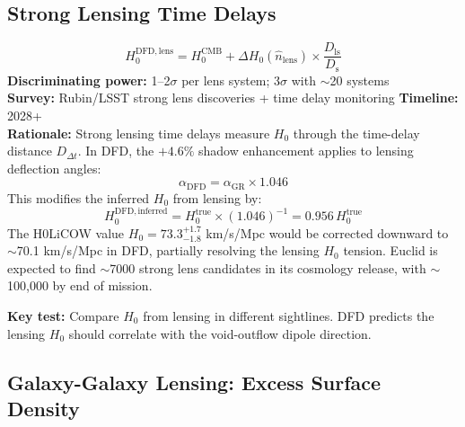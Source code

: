 \documentclass[12pt]{article}
\begin{document}
\subsection{Strong Lensing Time Delays}

\begin{predbox}
\begin{equation}
\boxed{
H_0^\mathrm{DFD,lens} = H_0^\mathrm{CMB} + \Delta H_0(\hat{n}_\mathrm{lens}) \times \frac{D_\mathrm{ls}}{D_\mathrm{s}}
}
\end{equation}
\textbf{Discriminating power:} 1--2$\sigma$ per lens system; 3$\sigma$ with $\sim$20 systems\\
\textbf{Survey:} Rubin/LSST strong lens discoveries + time delay monitoring \quad\textbf{Timeline:} 2028+\\
\textbf{Rationale:} Strong lensing time delays measure $H_0$ through the time-delay distance $D_{\Delta t}$. In DFD, the $+4.6\%$ shadow enhancement applies to lensing deflection angles:
\begin{equation}
\alpha_\mathrm{DFD} = \alpha_\mathrm{GR} \times 1.046
\end{equation}
This modifies the inferred $H_0$ from lensing by:
\begin{equation}
H_0^\mathrm{DFD,inferred} = H_0^\mathrm{true} \times (1.046)^{-1} = 0.956\,H_0^\mathrm{true}
\end{equation}
The H0LiCOW value $H_0 = 73.3^{+1.7}_{-1.8}$ km/s/Mpc would be corrected downward to $\sim$70.1 km/s/Mpc in DFD, partially resolving the lensing $H_0$ tension. Euclid is expected to find $\sim$7000 strong lens candidates in its cosmology release, with $\sim$100,000 by end of mission.

\medskip\noindent
\textbf{Key test:} Compare $H_0$ from lensing in different sightlines. DFD predicts the lensing $H_0$ should correlate with the void-outflow dipole direction.
\end{predbox}

\subsection{Galaxy-Galaxy Lensing: Excess Surface Density}
\end{document}
